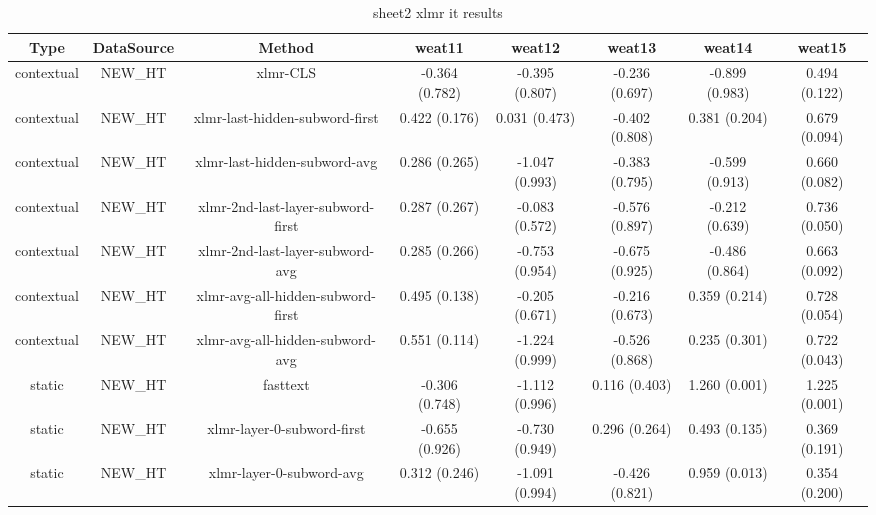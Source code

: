 \begin{sidewaystable}[htb]
    \centering
    \caption{sheet2 xlmr it results}
    \label{appendix_tab:sheet2_xlmr_it_results}
    \small
    \begin{tabular}{@{}cccccccc@{}}
        \toprule
        Type & DataSource & Method & weat11 & weat12 & weat13 & weat14 & weat15 \\
        \midrule
        contextual & NEW\_HT & xlmr-CLS & -0.364 (0.782) & -0.395 (0.807) & -0.236 (0.697) & -0.899 (0.983) & 0.494 (0.122) \\
        contextual & NEW\_HT & xlmr-last-hidden-subword-first & 0.422 (0.176) & 0.031 (0.473) & -0.402 (0.808) & 0.381 (0.204) & 0.679 (0.094) \\
        contextual & NEW\_HT & xlmr-last-hidden-subword-avg & 0.286 (0.265) & -1.047 (0.993) & -0.383 (0.795) & -0.599 (0.913) & 0.660 (0.082) \\
        contextual & NEW\_HT & xlmr-2nd-last-layer-subword-first & 0.287 (0.267) & -0.083 (0.572) & -0.576 (0.897) & -0.212 (0.639) & 0.736 (0.050) \\
        contextual & NEW\_HT & xlmr-2nd-last-layer-subword-avg & 0.285 (0.266) & -0.753 (0.954) & -0.675 (0.925) & -0.486 (0.864) & 0.663 (0.092) \\
        contextual & NEW\_HT & xlmr-avg-all-hidden-subword-first & 0.495 (0.138) & -0.205 (0.671) & -0.216 (0.673) & 0.359 (0.214) & 0.728 (0.054) \\
        contextual & NEW\_HT & xlmr-avg-all-hidden-subword-avg & 0.551 (0.114) & -1.224 (0.999) & -0.526 (0.868) & 0.235 (0.301) & 0.722 (0.043) \\
        static & NEW\_HT & fasttext & -0.306 (0.748) & -1.112 (0.996) & 0.116 (0.403) & 1.260 (0.001) & 1.225 (0.001) \\
        static & NEW\_HT & xlmr-layer-0-subword-first & -0.655 (0.926) & -0.730 (0.949) & 0.296 (0.264) & 0.493 (0.135) & 0.369 (0.191) \\
        static & NEW\_HT & xlmr-layer-0-subword-avg & 0.312 (0.246) & -1.091 (0.994) & -0.426 (0.821) & 0.959 (0.013) & 0.354 (0.200) \\
        \bottomrule
    \end{tabular}
\end{sidewaystable}